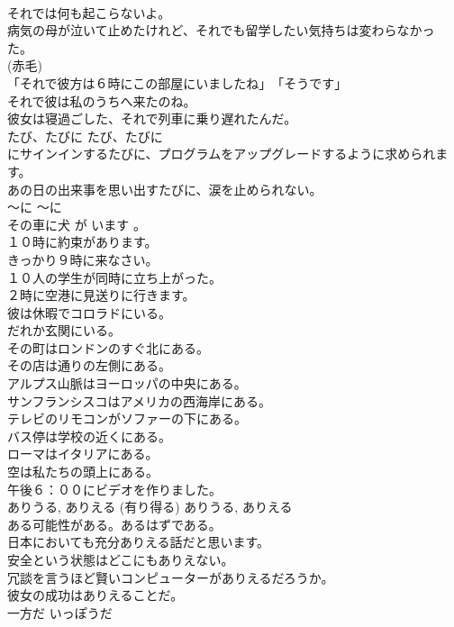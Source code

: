 \documentclass[8pt]{extreport}
\begin{document}
\begin{CJK}{UTF8}{min}
\\	それでは何も起こらないよ。   
\\	病気の母が泣いて止めたけれど、それでも留学したい気持ちは変わらなかった。  
\\	(赤毛)
\\	「それで彼方は６時にこの部屋にいましたね」　「そうです」   
\\	それで彼は私のうちへ来たのね。   
\\	彼女は寝過ごした、それで列車に乗り遅れたんだ。   
\\	たび、たびに	たび、たびに	
\\	にサインインするたびに、プログラムをアップグレードするように求められます。 
\\	あの日の出来事を思い出すたびに、涙を止められない。   
\\	〜に	〜に	
\\	その車に犬 が います 。
\\	１０時に約束があります。  
\\	きっかり９時に来なさい。  
\\	１０人の学生が同時に立ち上がった。  
\\	２時に空港に見送りに行きます。  
\\	彼は休暇でコロラドにいる。  
\\	だれか玄関にいる。  
\\	その町はロンドンのすぐ北にある。  
\\	その店は通りの左側にある。  
\\	アルプス山脈はヨーロッパの中央にある。  
\\	サンフランシスコはアメリカの西海岸にある。  
\\	テレビのリモコンがソファーの下にある。  
\\	バス停は学校の近くにある。  
\\	ローマはイタリアにある。  
\\	空は私たちの頭上にある。  
\\	午後６：００にビデオを作りました。  
\\	ありうる, ありえる (有り得る)	ありうる, ありえる	
\\	ある可能性がある。あるはずである。	
\\	日本においても充分ありえる話だと思います。  
\\	安全という状態はどこにもありえない。  
\\	冗談を言うほど賢いコンピューターがありえるだろうか。   
\\	彼女の成功はありえることだ。   
\\	一方だ	いっぽうだ	

\end{CJK}
\end{document}
